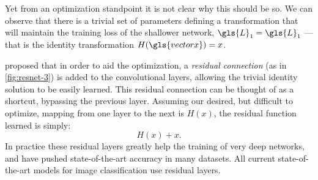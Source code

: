 \documentclass[thesis]{subfiles}
\begin{document}
Yet from an optimization standpoint it is not clear why this should be so. We can observe that there is a trivial set of parameters defining a transformation that will maintain the training loss of the shallower network, \ie $\gls{L}_1 = \gls{L}_1$ --- that is the identity transformation $H(\gls{vectorx})=x$. 

\citet{He2015} proposed that in order to aid the optimization, a \emph{residual connection} (as in \cref{fig:resnet-3}) is added to the convolutional layers, allowing the trivial identity solution to be easily learned. This residual connection can be thought of as a shortcut, bypassing the previous layer. Assuming our desired, but difficult to optimize, mapping from one layer to the next is $H(x)$, the residual function learned is simply:
\begin{equation}
	H(x) + x.
\end{equation}
%
In practice these residual layers greatly help the training of very deep networks, and have pushed state-of-the-art accuracy in many datasets. All current state-of-the-art models for image classification use residual layers.



\end{document}
